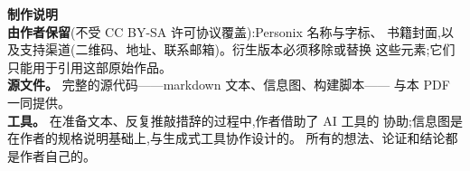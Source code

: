 \clearpage
\thispagestyle{empty}
\begin{flushleft}\small\sffamily
\textbf{制作说明}\\[1.2em]

\textbf{由作者保留}(不受 CC BY-SA 许可协议覆盖):Personix 名称与字标、
书籍封面,以及支持渠道(二维码、地址、联系邮箱)。衍生版本必须移除或替换
这些元素;它们只能用于引用这部原始作品。\\[1.2em]

\textbf{源文件。} 完整的源代码——markdown 文本、信息图、构建脚本——
与本 PDF 一同提供。\\[1.2em]

\textbf{工具。} 在准备文本、反复推敲措辞的过程中,作者借助了 AI 工具的
协助;信息图是在作者的规格说明基础上,与生成式工具协作设计的。
所有的想法、论证和结论都是作者自己的。
\end{flushleft}
\clearpage
